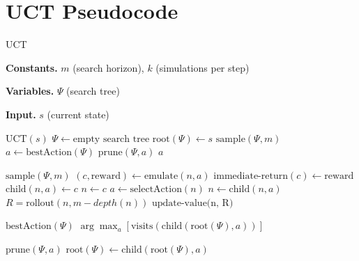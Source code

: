 \documentclass[twoside,11pt]{article}
\begin{document}
\newpage
\section{UCT Pseudocode}\label{appendix:uct_pseudocode}

\begin{algorithm}
\caption{UCT\label{algo:uct_algorithm}}
\begin{algorithmic}
\item[\textbf{Constants.}] $m$ (search horizon), $k$ (simulations per step)
\item[\textbf{Variables.}] $\Psi$ (search tree)
\item[\textbf{Input.}] $s$ (current state)
\STATE

\item[$\text{UCT}(s)$]
  \STATE $\Psi \gets \text{empty search tree}$
  \STATE $\text{root}(\Psi) \gets s$
\ENDIF
\REPEAT
  \STATE $\text{sample}(\Psi, m)$
\STATE $a \gets \text{bestAction}(\Psi)$
\STATE $\text{prune}(\Psi,a)$ 
\RETURN $a$

\STATE
\item[$\text{sample}(\Psi, m)$]
    \STATE $(c,\text{reward}) \gets \text{emulate}(n,a)$  
    \STATE $\text{immediate-return}(c) \gets \text{reward}$
    \STATE $\text{child}(n,a) \gets c$
    \STATE $n \gets c$  
  \ELSE
    \STATE $a \gets \text{selectAction}(n)$
    \STATE $n \gets \text{child}(n, a)$ 
  \ENDIF
\ENDWHILE
\STATE $R = \text{rollout}(n, m - depth(n))$
\STATE $\text{update-value(n, R)}$ 

\STATE
\item[$\text{bestAction}(\Psi)$]
\RETURN $\arg \max_a \left [ \text{visits}(\text{child}(\text{root}(\Psi), a)) \right ]$ 

\STATE
\item[$\text{prune}(\Psi, a)$]
\STATE $\text{root}(\Psi) \gets \text{child}(\text{root}(\Psi), a)$

\end{algorithmic}
\end{algorithm}
\end{document}
